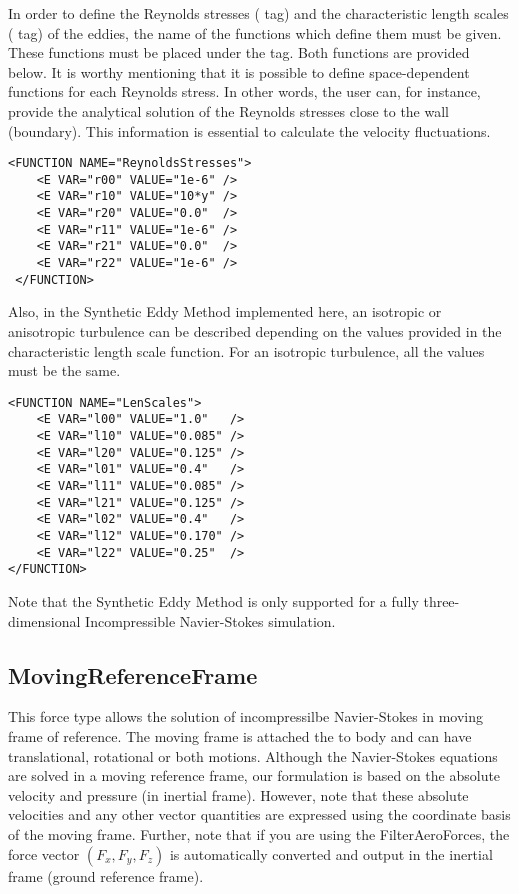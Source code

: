 In order to define the Reynolds stresses ( tag) and the characteristic length scales  ( tag) of the eddies, the name of the functions which define them must be given. These functions must be placed under the    tag. Both functions are provided below. It is worthy mentioning that it is possible to define space-dependent functions for each Reynolds stress. In other words, the user can, for instance, provide the analytical solution of the Reynolds stresses close to the wall (boundary). This information is essential to calculate the velocity fluctuations. 

\begin{lstlisting}[style=XMLStyle] 
<FUNCTION NAME="ReynoldsStresses">
    <E VAR="r00" VALUE="1e-6" />
    <E VAR="r10" VALUE="10*y" />
    <E VAR="r20" VALUE="0.0"  />
    <E VAR="r11" VALUE="1e-6" />
    <E VAR="r21" VALUE="0.0"  />
    <E VAR="r22" VALUE="1e-6" />
 </FUNCTION>
\end{lstlisting}

Also, in the Synthetic Eddy Method implemented here, an isotropic or anisotropic turbulence can be described depending on the values provided in the characteristic length scale function.  For an isotropic turbulence, all the values must be the same.

\begin{lstlisting}[style=XMLStyle] 
<FUNCTION NAME="LenScales">
    <E VAR="l00" VALUE="1.0"   />
    <E VAR="l10" VALUE="0.085" />
    <E VAR="l20" VALUE="0.125" />
    <E VAR="l01" VALUE="0.4"   />
    <E VAR="l11" VALUE="0.085" />
    <E VAR="l21" VALUE="0.125" />
    <E VAR="l02" VALUE="0.4"   />
    <E VAR="l12" VALUE="0.170" />
    <E VAR="l22" VALUE="0.25"  />
</FUNCTION>
\end{lstlisting}

Note that the Synthetic Eddy Method is only supported for a fully three-dimensional Incompressible Navier-Stokes simulation.

\subsection{MovingReferenceFrame}
This force type allows the solution of incompressilbe Navier-Stokes in moving frame of reference. The moving frame is attached the to body and can have translational, rotational or both motions. Although the Navier-Stokes equations are solved in a moving reference frame, our formulation is based on the absolute velocity and pressure (in inertial frame). However, note that these absolute velocities and any other vector quantities are expressed using the coordinate basis of the moving frame. Further, note that if you are using the FilterAeroForces, the force vector $\left(F_x, F_y, F_z\right)$ is automatically converted and output in the inertial frame (ground reference frame).

